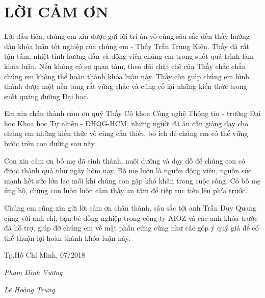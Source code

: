 \newpage
\chapter*{LỜI CẢM ƠN}
Lời đầu tiên, chúng em xin được gửi lời tri ân vô cùng sâu sắc đến thầy hướng dẫn khóa luận tốt nghiệp của chúng em - Thầy Trần Trung Kiên. Thầy đã rất tận tâm, nhiệt tình hướng dẫn và động viên chúng em trong suốt quá trình làm khóa luận. Nếu không có sự quan tâm, theo dõi chặt chẽ của Thầy chắc chắn chúng em không thể hoàn thành khóa luận này. Thầy còn giúp chúng em hình thành được một nền tảng rất vững chắc và củng cố lại những kiến thức trong suốt quãng đường Đại học.

Em xin chân thành cảm ơn quý Thầy Cô khoa Công nghệ Thông tin - trường Đại học Khoa học Tự nhiên - ĐHQG-HCM, những người đã ân cần giảng dạy cho chúng em những kiến thức vô cùng cần thiết, bổ ích để chúng em có thể vững bước trên con đường sau này.

Con xin cảm ơn bố mẹ đã sinh thành, nuôi dưỡng và dạy dỗ để chúng con có được thành quả như ngày hôm nay. Bố mẹ luôn là nguồn động viên, nguồn sức mạnh hết sức lớn lao mỗi khi chúng con gặp khó khăn trong cuộc sống. Có bố mẹ ủng hộ, chúng con luôn luôn cảm thấy an tâm để tiếp tục tiến lên phía trước.

Chúng em cũng xin gửi lời cảm ơn chân thành, sâu sắc tới anh Trần Duy Quang cùng với anh chị, bạn bè đồng nghiệp trong công ty AIOZ và các anh khóa trước đã hỗ trợ, giúp đỡ chúng em về mặt phần cứng cũng như các góp ý quý giá để có thể thuận lợi hoàn thành khóa luận này.



\hfill Tp.Hồ Chí Minh, 07/2018

\hfill \textit{Phạm Đình Vương}

\hfill \textit{Lê Hoàng Trung}
